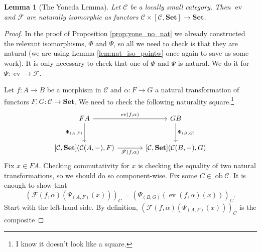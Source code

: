 \documentclass{report}
\newcommand{\mbold}[1]{\mathrm{\mathbf{#1}}}
\DeclareMathOperator{\ev}{ev}
\DeclareMathOperator{\ob}{ob}
\theoremstyle{definition}
\theoremstyle{plain}
\newtheorem{lem}[thm]{Lemma}
\theoremstyle{definition}
\begin{document}
		\begin{lem}[The Yoneda Lemma]
			Let $\mathcal{C}$ be a locally small category. Then $\ev$ and $\mathscr{F}$ are naturally isomorphic as functors $\mathcal{C}\times[\mathcal{C},\mbold{Set}] \to \mbold{Set}$.
		\end{lem}
		\begin{proof}
			In the proof of Proposition \ref{prop:yone_no_nat} we already constructed the relevant isomorphisms, $\Phi$ and $\Psi$, so all we need to check is that they are natural (we are using Lemma \ref{lem:nat_iso_pointw} once again to save us some work). It is only necessary to check that one of $\Phi$ and $\Psi$ is natural. We do it for $\Psi \colon \ev \to \mathscr{F}$.
			
			Let $f\colon A \to B$ be a morphism in $\mathcal{C}$ and $\alpha \colon F \to G$ a natural transformation of functors $F,G\colon\mathcal{C}\to\mbold{Set}$. We need to check the following naturality square.\footnote{I know it doesn't look like a square.}
			\[\begin{tikzcd}[column sep=large, row sep=large]
				FA & GB \\
				{[\mathcal{C},\mbold{Set}](\mathcal{C}(A,-),F)} & {[\mathcal{C},\mbold{Set}](\mathcal{C}(B,-),G)}
				\arrow["{\ev (f,\alpha)}", from=1-1, to=1-2]
				\arrow["{\mathscr{F}(f,\alpha)}"', from=2-1, to=2-2]
				\arrow["{\Psi_{(A,F)}}"', from=1-1, to=2-1]
				\arrow["{\Psi_{(B,G)}}", from=1-2, to=2-2]
			\end{tikzcd}\]
			Fix $x\in FA$. Checking commutativity for $x$ is checking the equality of two natural transformations, so we should do so component-wise. Fix some $C\in\ob\mathcal{C}$. It is enough to show that
			\begin{equation}\label{eq:yoneda}
				(\mathscr{F}(f,\alpha) (\Psi_{(A,F)} (x)))_C = (\Psi_{(B,G)}(\ev(f,\alpha)(x)))_C.
			\end{equation}
			Start with the left-hand side. By definition, $(\mathscr{F}(f,\alpha) (\Psi_{(A,F)} (x)))_C$ is the composite

\end{proof}
\end{document}
